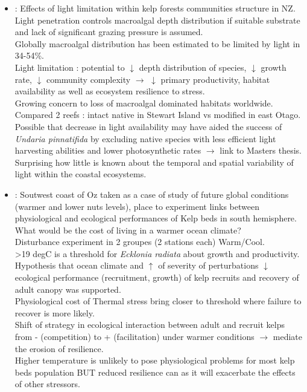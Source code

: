 \documentclass[]{report}
\begin{document}
\begin{itemize}
		\item \cite{desmond2015light} : Effects of light limitation within kelp forests communities structure in NZ.
		\\ Light penetration controls macroalgal depth distribution if suitable substrate and lack of significant grazing pressure is assumed.
		\\Globally macroalgal distribution has been estimated to be limited by light in 34-54\%.
		\\Light limitation : potential to $\downarrow$ depth distribution of species, $\downarrow$ growth rate, $\downarrow$ community complexity $\rightarrow$ $\downarrow$ primary productivity, habitat availability as well as ecosystem resilience to stress.
		\\Growing concern to loss of macroalgal dominated habitats worldwide.
		\\Compared 2 reefs : intact native in Stewart Island vs modified in east Otago.
		\\Possible that decrease in light availability may have aided the success of \textit{Undaria pinnatifida} by excluding native species with less efficient light harvesting abilities and lower photosynthetic rates $\rightarrow$ link to Masters thesis.
		\\Surprising how little is known about the temporal and spatial variability of light within the coastal ecosystems.
		
		\item \cite{wernberg2010decreasing} :	Soutwest coast of Oz taken as a case of study of future global conditions (warmer and lower nuts levels), place to experiment links between physiological and ecological performances of Kelp beds in south hemisphere. What would be the cost of living in a warmer ocean climate?
		\\Disturbance experiment in 2 groupes (2 stations each) Warm/Cool.
		\\ >19 degC is a threshold for \textit{Ecklonia radiata} about growth and productivity. 
		\\ Hypothesis that ocean climate and $\uparrow$ of severity of perturbations $\downarrow$ ecological performance (recruitment, growth) of kelp recruits and recovery of adult canopy was supported.
		\\Physiological cost of Thermal stress bring closer to threshold where failure to recover is more likely.
		\\Shift of strategy in ecological interaction between adult and recruit kelps from - (competition) to + (facilitation) under warmer conditions $\rightarrow$ mediate the erosion of resilience.
		\\Higher temperature is unlikely to pose physiological problems for most kelp beds population BUT reduced resilience can as it will exacerbate the effects of other stressors.
		

\end{itemize}
\end{document}
